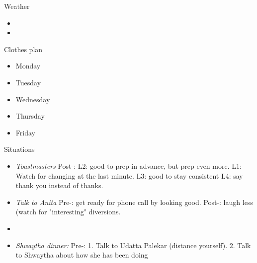 \documentclass[serif, mathserif, final]{beamer}
\begin{document}
\begin{frame}
\begin{columns}
\begin{column}{0.20\linewidth}
      \begin{block}{Weather} 
        \begin{itemize}
          \tiny \item \tiny 
        \item \tiny 
        \end{itemize}
      \end{block} 

      \begin{block}{Clothes plan} 
        \begin{itemize}
          \tiny \item \tiny Monday
        \item \tiny Tuesday
        \item \tiny Wednesday
        \item \tiny Thursday
        \item \tiny Friday
        \end{itemize} 
      \end{block}
      
      \begin{block}{Situations}

        \begin{itemize} 


          \tiny \item \tiny \textit{Toastmasters} Post-: L2: good to prep
          in advance, but prep even more. L1: Watch for changing at the last minute.  
          L3: good to stay consistent L4: say thank you instead of
          thanks. 

          \tiny \item \tiny \textit{Talk to Anita} Pre-: get ready for
          phone call by looking good. Post-: laugh less (watch for
          "interesting" diversions. 
        \item \tiny \item  \textit{Shwaytha dinner:} Pre-: 1. Talk to
          Udatta Palekar (distance yourself). 2. Talk to Shwaytha about
          how she has been doing


\end{itemize}
\end{block}
\end{column}
\end{columns}
\end{frame}
\end{document}
